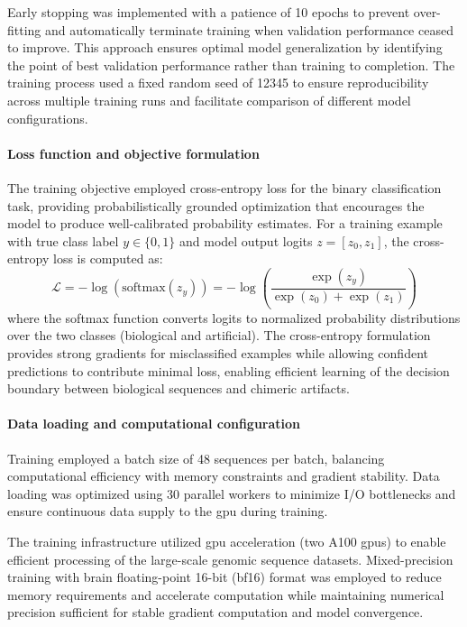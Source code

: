\documentclass[pdflatex,sn-nature]{sn-jnl}%
\theoremstyle{thmstyleone}%
\theoremstyle{thmstyletwo}%
\theoremstyle{thmstylethree}%
\begin{document}
Early stopping was implemented with a patience of 10 epochs to prevent over-fitting and automatically terminate training when validation performance ceased to improve.
This approach ensures optimal model generalization by identifying the point of best validation performance rather than training to completion.
The training process used a fixed random seed of 12345 to ensure reproducibility across multiple training runs and facilitate comparison of different model configurations.

\paragraph{Loss function and objective formulation}
The training objective employed cross-entropy loss for the binary classification task, providing probabilistically grounded optimization that encourages the model to produce well-calibrated probability estimates.
For a training example with true class label $y \in \{0,1\}$ and model output logits $z = [z_0, z_1]$, the cross-entropy loss is computed as:
$$
	\mathcal{L} = -\log(\textrm{softmax}(z_y)) = -\log\left(\frac{\exp(z_y)}{\exp(z_0) + \exp(z_1)}\right)
$$
where the softmax function converts logits to normalized probability distributions over the two classes (biological and artificial).
The cross-entropy formulation provides strong gradients for misclassified examples while allowing confident predictions to contribute minimal loss, enabling efficient learning of the decision boundary between biological sequences and chimeric artifacts.

\paragraph{Data loading and computational configuration}
Training employed a batch size of 48 sequences per batch, balancing computational efficiency with memory constraints and gradient stability.
Data loading was optimized using 30 parallel workers to minimize I/O bottlenecks and ensure continuous data supply to the \gls{gpu} during training.

The training infrastructure utilized \gls{gpu} acceleration (two A100 \glspl{gpu}) to enable efficient processing of the large-scale genomic sequence datasets.
Mixed-precision training with brain floating-point 16-bit (bf16) format was employed to reduce memory requirements and accelerate computation while maintaining numerical precision sufficient for stable gradient computation and model convergence.
\end{document}
